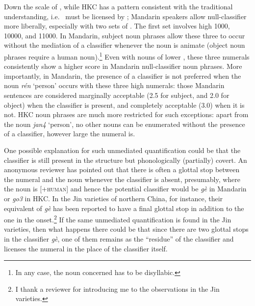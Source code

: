 \documentclass[output=paper]{langsci/langscibook}
\begin{document}
Down the scale of , while \gls{HKC} has a
pattern consistent with the traditional understanding, i.e.\ 
must be licensed by ; Mandarin speakers allow null-classifier
 more liberally, especially with two sets of .
The first set involves high  1000, 10000, and 11000. In
Mandarin, subject noun phrases allow these three  to
occur without the mediation of a classifier whenever the noun
is animate (object noun phrases require a human noun).\footnote{In any case,
the noun concerned has to be disyllabic.} Even with nouns of lower
, these three numerals consistently show a higher score in
Mandarin null-classifier noun phrases. More importantly, in
Mandarin, the presence of a classifier is not
preferred when the noun \emph{rén} ‘person’ occurs with these three high
numerals: those Mandarin sentences are considered marginally
acceptable (2.5 for subject, and 2.0 for object) when the
classifier is present, and completely acceptable (3.0) when it
is not. \gls{HKC} noun phrases are much more restricted
for such exceptions: apart from the noun \emph{jan4} ‘person’, no other nouns
can be enumerated without the presence of a classifier, however large the
numeral is.

One possible explanation for such unmediated quantification could be that the
classifier is still present in the structure but phonologically
(partially) covert. An anonymous reviewer has pointed out that there is often a
glottal stop between the numeral and the noun whenever the
classifier is absent, presumably, where the noun is [+\textsc{human}] and hence
the potential classifier would be \emph{gè} in
Mandarin or \emph{go3} in \gls{HKC}. In the Jin varieties of
northern China, for instance, their equivalent of \emph{gè} has been reported
to have a final glottal stop in addition to the one in the onset.\footnote{I
    thank a reviewer for introducing me to the observations in the Jin
varieties.} If the same unmediated quantification is found in the Jin
varieties, then what happens there could be that since there are two glottal
stops in the classifier \emph{gè}, one of them remains as the
\enquote{residue} of the classifier and licenses the numeral in the place of
the classifier itself.
\end{document}
